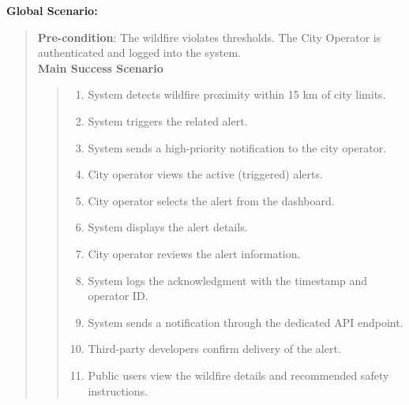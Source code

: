 \documentclass[]{article}
\begin{document}
\begin{enumerate}[{\bf BE4.}]
        {\bf Global Scenario:}
        	\begin{quote}
        	    \textbf{Pre-condition}: The wildfire violates thresholds. The City Operator is authenticated and logged into the system. \\
                \textbf{Main Success Scenario} 
                    \begin{quote}
                    \begin{enumerate}[1.]
                        \item System detects wildfire proximity within 15 km of city limits.
                        \item System triggers the related alert.
                        \item System sends a high-priority notification to the city operator.
                        \item City operator views the active (triggered) alerts.
                        \item City operator selects the alert from the dashboard.
                        \item System displays the alert details.
                        \item City operator reviews the alert information.
                        \item System logs the acknowledgment with the timestamp and operator ID.
                        \item System sends a notification through the dedicated API endpoint.
                        \item Third-party developers confirm delivery of the alert.
                        \item Public users view the wildfire details and recommended safety instructions.
                    \end{enumerate}
                    \end{quote}
        	\end{quote}
\end{enumerate}
\end{document}
